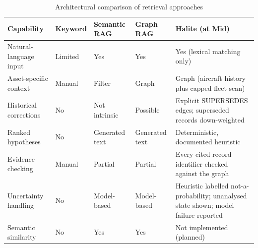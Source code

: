 \begin{table}[H]
\centering
\caption{Architectural comparison of retrieval approaches}
\label{tab:retrieval-compare}
\footnotesize
\begin{tabularx}{\textwidth}{@{}>{\raggedright\arraybackslash}p{} >{\raggedright\arraybackslash}p{} >{\raggedright\arraybackslash}p{} >{\raggedright\arraybackslash}p{} L@{}}
\toprule
Capability & Keyword & Semantic RAG & Graph RAG & Halite (at Mid) \\
\midrule
Natural-language input & Limited & Yes & Yes & Yes (lexical matching only) \\
Asset-specific context & Manual & Filter & Graph & Graph (aircraft history plus capped fleet scan) \\
Historical corrections & No & Not intrinsic & Possible & Explicit SUPERSEDES edges; superseded records down-weighted \\
Ranked hypotheses & No & Generated text & Generated text & Deterministic, documented heuristic \\
Evidence checking & Manual & Partial & Partial & Every cited record identifier checked against the graph \\
Uncertainty handling & No & Model-based & Model-based & Heuristic labelled not-a-probability; unanalysed state shown; model failure reported \\
Semantic similarity & No & Yes & Yes & Not implemented (planned) \\
\bottomrule
\end{tabularx}
\end{table}
